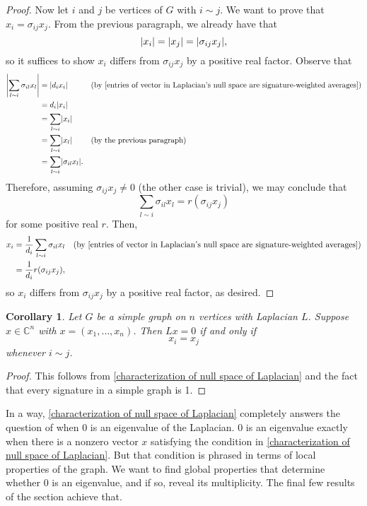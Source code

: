 \documentclass[12pt]{article}
\newtheorem{corollary}[thm]{Corollary}
\theoremstyle{definition}
\newcommand{\C}{\mathbb C}
\DeclarePairedDelimiter\abs{\lvert}{\rvert}%
\begin{document}
\begin{proof}
Now let $i$ and $j$ be vertices of $G$ with $i \sim j$. We want to prove that $x_i = \sigma_{ij}x_j$. From the previous paragraph, we already have that
$$\abs*{x_i} = \abs*{x_j} = \abs*{\sigma_{ij} x_j},$$
so it suffices to show $x_i$ differs from $\sigma_{ij} x_j$ by a positive real factor. Observe that 
\begin{align*}
\abs*{\sum_{l \sim i} \sigma_{il}x_l} &= \abs*{d_i x_i} && \text{(by \cref{entries of vector in Laplacian's null space are signature-weighted averages})} \\
&= d_i \abs*{x_i} \\
&= \sum_{l \sim i} \abs*{x_i} \\
&= \sum_{l \sim i} \abs*{x_l} && \text{(by the previous paragraph)} \\
&= \sum_{l \sim i} \abs*{\sigma_{il} x_l}.
\end{align*}
Therefore, assuming $\sigma_{ij} x_j \neq 0$ (the other case is trivial), we may conclude that 
$$\sum_{l \sim i} \sigma_{il}x_l = r (\sigma_{ij}x_j)$$
for some positive real $r$. Then,
\begin{align*}
x_i &= \frac{1}{d_i} \sum_{l \sim i} \sigma_{il}x_l && \text{(by \cref{entries of vector in Laplacian's null space are signature-weighted averages})} \\
&= \frac{1}{d_i} r (\sigma_{ij}x_j),
\end{align*}
so $x_i$ differs from $\sigma_{ij}x_j$ by a positive real factor, as desired.
\end{proof}

\begin{corollary}\label{null space of simple graph Laplacian}
Let $G$ be a simple graph on $n$ vertices with Laplacian $L$. Suppose $x \in \C^n$ with $x = (x_1, \dots, x_n)$. Then $Lx = 0$ if and only if $$x_i = x_j$$ whenever $i \sim j$.
\end{corollary}
\begin{proof}
This follows from \cref{characterization of null space of Laplacian} and the fact that every signature in a simple graph is 1.
\end{proof}

In a way, \cref{characterization of null space of Laplacian} completely answers the question of when 0 is an eigenvalue of the Laplacian. 0 is an eigenvalue exactly when there is a nonzero vector $x$ satisfying the condition in \cref{characterization of null space of Laplacian}. But that condition is phrased in terms of local properties of the graph. We want to find global properties that determine whether 0 is an eigenvalue, and if so, reveal its multiplicity. The final few results of the section achieve that.
\end{document}
